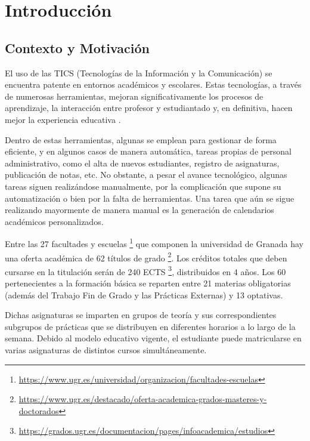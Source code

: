 \chapter{Introducción}


\section{Contexto y Motivación}
El uso de las TICS (Tecnologías de la Información y la Comunicación) se encuentra patente en entornos académicos y escolares. Estas tecnologías, a través de numerosas herramientas, mejoran significativamente los procesos de aprendizaje, la interacción entre profesor y estudiantado y, en definitiva, hacen mejor la experiencia educativa \cite{Flores-Alarcia2012,Paladines,TICenLaEducacion}.\newline

Dentro de estas herramientas, algunas se emplean para gestionar de forma eficiente, y en algunos casos de manera automática, tareas propias de personal administrativo, como el alta de nuevos estudiantes, registro de asignaturas, publicación de notas, etc. No obstante, a pesar el avance tecnológico, algunas tareas siguen realizándose manualmente, por la complicación que supone su automatización o bien por la falta de herramientas. Una tarea que aún se sigue realizando mayormente de manera manual es la generación de calendarios académicos personalizados.\newline

Entre las 27 facultades y escuelas \footnote[1]{\url{https://www.ugr.es/universidad/organizacion/facultades-escuelas}} que componen la universidad de Granada hay una oferta académica de 62 títulos de grado \footnote[2]{\url{https://www.ugr.es/destacado/oferta-academica-grados-masteres-y-doctorados}}. Los créditos totales que deben cursarse en la titulación serán de 240 ECTS \footnote[3]{\url{https://grados.ugr.es/documentacion/pages/infoacademica/estudios}}, distribuidos en 4 años. Los 60 pertenecientes a la formación básica se reparten entre 21 materias obligatorias (además del Trabajo Fin de Grado y las Prácticas Externas) y 13 optativas.\newline

Dichas asignaturas se imparten en grupos de teoría y sus correspondientes subgrupos de prácticas que se distribuyen en diferentes horarios a lo largo de la semana. Debido al modelo educativo vigente, el estudiante puede matricularse en varias asignaturas de distintos cursos simultáneamente.\newline

